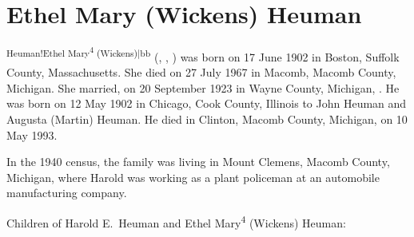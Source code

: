 \section{Ethel Mary (Wickens) Heuman}

\textsuperscript{Heuman!Ethel Mary\textsuperscript{4} (Wickens)|bb} (, , ) was born on 17 June 1902 in Boston, Suffolk County, Massachusetts.\cite{Ethel4WickensBirth} She died on 27 July 1967 in Macomb, Macomb County, Michigan.\cite{Ethel4WickensDeath} She married, on 20 September 1923 in Wayne County, Michigan, .\cite{Ethel4WickensMarriage} He was born on 12 May 1902 in Chicago, Cook County, Illinois\cite{HaroldHeumanDeath,HaroldHeumanDraft} to John Heuman and Augusta (Martin) Heuman.\cite{Census1910HaroldHeuman,GraceHeumanBirth} He died in Clinton, Macomb County, Michigan, on 10 May 1993.\cite{HaroldHeumanDeath}

In the 1940 census, the family was living in Mount Clemens, Macomb County, Michigan, where Harold was working as a plant policeman at an automobile manufacturing company.\cite{Census1940HaroldHeuman}

\begin{KidsIntro}
	Children of Harold E.\ Heuman and Ethel Mary\textsuperscript{4} (Wickens) Heuman:
\end{KidsIntro}

\begin{Kids}
	
	
\end{Kids}